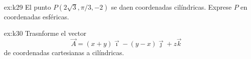     \begin{excercise}[][][$P=P(4, 2\pi/3, \pi/3)$]{ex:k29}{ 
            El punto $P(2\sqrt{3},\pi/3, -2)$ se daen coordenadas cilíndricas. Exprese $P$ en coordenadas esféricas.        
        }
    \end{excercise}

    \begin{excercise}[][][$\vec{A}=R\vec{e}_R-R\sin{\phi}\vec{e}_\theta$]{ex:k30}{ 
            Trasnforme el vector 
            \begin{equation*}
                \vec{A}=(x+y)\vec{\imath}-(y-x)\vec{\jmath} +z\vec{k}
            \end{equation*}
            de coordenadas cartesianas a cilíndricas.
        }
    \end{excercise}

